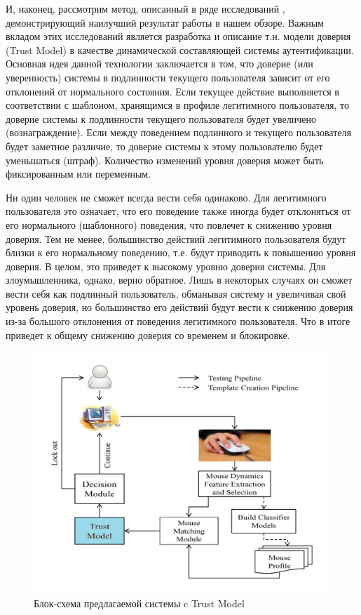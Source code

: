 \documentclass[12pt]{article}
\begin{document}
    \par И, наконец, рассмотрим метод, описанный в ряде исследований \cite{Mondal, Mondal_2, Mondal_3}, демонстрирующий наилучший результат работы в нашем обзоре. Важным вкладом этих исследований является разработка и описание т.н. модели доверия (Trust Model) в качестве динамической составляющей системы аутентификации. Основная идея данной технологии заключается в том, что доверие (или уверенность) системы в подлинности текущего пользователя зависит от его отклонений от нормального состояния. Если текущее действие выполняется в соответствии с шаблоном, хранящимся в профиле легитимного пользователя, то доверие системы к подлинности текущего пользователя будет увеличено (вознаграждение). Если между поведением подлинного и текущего пользователя будет заметное различие, то доверие системы к этому пользователю будет уменьшаться (штраф). Количество изменений уровня доверия может быть фиксированным или переменным.

    \par Ни один человек не сможет всегда вести себя одинаково. Для легитимного пользователя это означает, что его поведение также иногда будет отклоняться от его нормального (шаблонного) поведения, что повлечет к снижению уровня доверия. Тем не менее, большинство действий легитимного пользователя будут близки к его нормальному поведению, т.е. будут приводить к повышению уровня доверия. В целом, это приведет к высокому уровню доверия системы. Для злоумышленника, однако, верно обратное. Лишь в некоторых случаях он сможет вести себя как подлинный пользователь, обманывая систему и увеличивая свой уровень доверия, но большинство его действий будут вести к снижению доверия из-за большого отклонения от поведения легитимного пользователя. Что в итоге приведет к общему снижению доверия со временем и блокировке.

    \begin{figure}[h!]
        \centering
        \includegraphics[width=0.6\linewidth]{TrustModel.png}
        \caption{Блок-схема предлагаемой системы c Trust Model}
        \label{sec:Overview:Model:fig:2DCNN}
    \end{figure}
\end{document}
